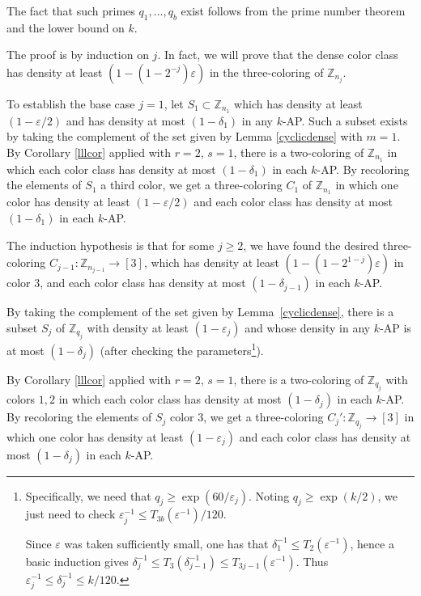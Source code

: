 \documentclass[11pt]{article}
\makeatletter
\numberwithin{equation}{section}
\renewenvironment{proof}[1][\proofname]{\par
  \vspace{-\topsep}%
  \pushQED{\qed}%
  \normalfont
  \topsep0pt \partopsep0pt %
  \trivlist
  \item[\hskip\labelsep
        \itshape
    #1\@addpunct{.}]\ignorespaces
}{%
  \popQED\endtrivlist\@endpefalse
  \addvspace{6pt plus 6pt} %
}
\theoremstyle{definition}
\theoremstyle{remark}
\makeatother
\begin{document}
\begin{proof}
The fact that such primes $q_1,\ldots,q_b$ exist follows from the prime number theorem and the lower bound on $k$. 

The proof is by induction on $j$. In fact, we will prove that the dense color class has density at least $(1-(1-2^{-j})\varepsilon)$ in the three-coloring of $\mathbb{Z}_{n_j}$. 

To establish the base case $j=1$, let $S_1 \subset \mathbb{Z}_{n_1}$ which has density at least $(1-\varepsilon/2)$ and has density at most $(1-\delta_1)$ in any $k$-AP. Such a subset exists by taking the complement of the set given by Lemma \ref{cyclicdense} with $m=1$. By Corollary \ref{lllcor} applied with $r=2$, $s=1$, there is a two-coloring of $\mathbb{Z}_{n_1}$ in which each color class has density at most $(1-\delta_1)$ in each $k$-AP. By recoloring the elements of $S_1$  a third color, we get a three-coloring $C_1$ of $\mathbb{Z}_{n_1}$ in which one color has density at least $(1-\varepsilon/2)$ and each color class has density at most $(1-\delta_1)$ in each $k$-AP.

 


The induction hypothesis is that for some $j \geq 2$, we have found the desired three-coloring $C_{j-1}:\mathbb{Z}_{n_{j-1}}\rightarrow [3]$, which has density at least $(1-(1-2^{1-j})\varepsilon)$ in color $3$, and each color class has density at most $(1-\delta_{j-1})$ in each $k$-AP. 

By taking the complement of the set given by Lemma~\ref{cyclicdense}, there is a subset $S_j$ of $\mathbb{Z}_{q_j}$ with density at least $(1-\varepsilon_j)$ and whose density in any $k$-AP is at most $(1-\delta_j)$ (after checking the parameters\footnote{Specifically, we need that $q_j\ge \exp(60/\varepsilon_j)$. Noting $q_j\ge \exp(k/2)$, we just need to check $\varepsilon_j^{-1}\le T_{3b}(\varepsilon^{-1})/120$. 

Since $\varepsilon$ was taken sufficiently small, one has that $\delta_1^{-1}\le T_2(\varepsilon^{-1})$, hence a basic induction gives $\delta_j^{-1}\le T_3(\delta_{j-1}^{-1})\le T_{3j-1}(\varepsilon^{-1})$. Thus $\varepsilon_j^{-1}\le \delta_j^{-1}\le k/120$.}).

By Corollary \ref{lllcor} applied with $r=2$, $s=1$, there is a two-coloring of $\mathbb{Z}_{q_j}$ with colors $1,2$ in which each color class has density at most $(1-\delta_j)$ in each $k$-AP. By recoloring the elements of $S_j$ color $3$, we get a three-coloring $C_j':\mathbb{Z}_{q_j} \rightarrow [3]$ in which one color has density at least $(1-\varepsilon_j)$ and each color class has density at most $(1-\delta_j)$ in each $k$-AP.


\end{proof}
\end{document}
